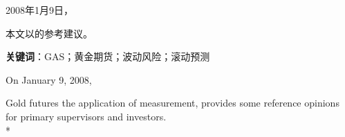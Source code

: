 \begin{cabstract}
  \renewcommand{\chapterlabel}{摘\hspace{2em}要}

2008年1月9日，

本文以的参考建议。 
  
  \bigbreak

  {\bfseries 关键词}：GAS；黄金期货；波动风险；滚动预测
   
\blankpage
\end{cabstract}




\begin{eabstract}
On January 9, 2008, 

Gold futures the application of measurement, provides some reference 
opinions for primary supervisors and investors.
  \\*

\end{eabstract}




